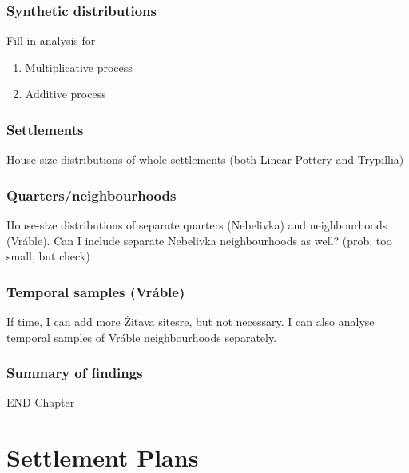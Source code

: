 \documentclass[
  12pt,
]{book}
\begin{document}
\hypertarget{synthetic-distributions}{%
\section{Synthetic distributions}\label{synthetic-distributions}}

Fill in analysis for

\begin{enumerate}
\def\labelenumi{\arabic{enumi}.}
\item
  Multiplicative process
\item
  Additive process
\end{enumerate}

\hypertarget{settlements}{%
\section{Settlements}\label{settlements}}

House-size distributions of whole settlements (both Linear Pottery and Trypillia)

\hypertarget{quartersneighbourhoods}{%
\section{Quarters/neighbourhoods}\label{quartersneighbourhoods}}

House-size distributions of separate quarters (Nebelivka) and neighbourhoods (Vráble). Can I include separate Nebelivka neighbourhoods as well? (prob. too small, but check)

\hypertarget{temporal-samples-vruxe1ble}{%
\section{Temporal samples (Vráble)}\label{temporal-samples-vruxe1ble}}

If time, I can add more Žitava sitesre, but not necessary. I can also analyse temporal samples of Vráble neighbourhoods separately.

\hypertarget{summary-of-findings}{%
\section{Summary of findings}\label{summary-of-findings}}

END Chapter

\hypertarget{part-settlement-plans}{%
\part{Settlement Plans}\label{part-settlement-plans}}
\end{document}
